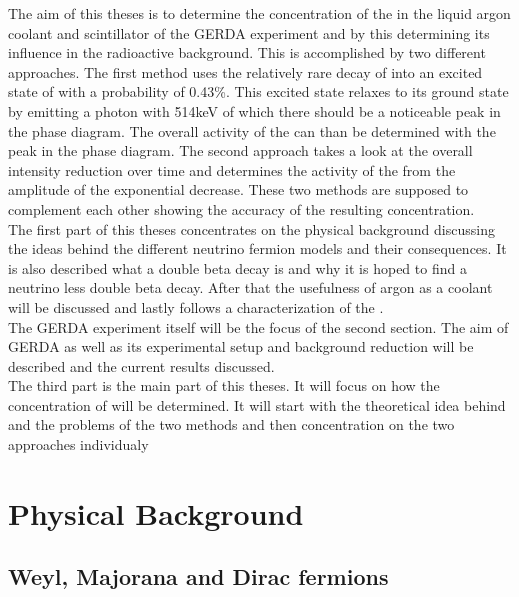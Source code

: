 The aim of this theses is to determine the concentration of the  in the liquid argon coolant and scintillator of the GERDA experiment and by this determining its influence in the radioactive background. This is accomplished by two different approaches. The first method uses the relatively rare decay of  into an excited state of  with a probability of 0.43\%. This excited state relaxes to its ground state by emitting a photon with 514keV of which there should be a noticeable peak in the phase diagram. The overall activity of the  can than be determined with the peak in the phase diagram. The second approach takes a look at the overall intensity reduction over time and determines the activity of the  from the amplitude of the exponential decrease. These two methods are supposed to complement each other showing the accuracy of the resulting concentration.\\

The first part of this theses concentrates on the physical background discussing the ideas behind the different neutrino fermion models and their consequences. It is also described what a double beta decay is and why it is hoped to find a neutrino less double beta decay. After that the usefulness of argon as a coolant will be discussed and lastly follows a characterization of the .\\

The GERDA experiment itself will be the focus of the second section. The aim of GERDA as well as its experimental setup and background reduction will be described and the current results discussed.\\

The third part is the main part of this theses. It will focus on how the concentration of  will be determined. It will start with the theoretical idea behind and the problems of the two methods and then concentration on the two approaches individualy


\section{Physical Background}
\label{sec:PhyBG}

\subsection{Weyl, Majorana and Dirac fermions}
\label{sec:WMDf}

